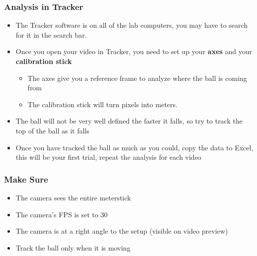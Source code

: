 \documentclass[aspectratio=169]{beamer}
\begin{document}
\begin{frame}
  \frametitle{Analysis in Tracker}
  \begin{itemize}
  \item The Tracker software is on all of the lab computers, you may have to search for it in the search bar. 
  \item Once you open your video in Tracker, you need to set up your \textbf{axes} and your \textbf{calibration stick}
    \begin{itemize}
    \item The axes give you a reference frame to analyze where the ball is coming from
    \item The calibration stick will turn pixels into meters.
    \end{itemize}
  \item The ball will not be very well defined the faster it falls, so try to track the top of the ball as it falls
  \item Once you have tracked the ball as much as you could, copy the data to Excel, this will be your first trial, repeat the analysis for each video
  \end{itemize}
\end{frame}

\begin{frame}
  \frametitle{Make Sure}
  \begin{itemize}
  \item The camera sees the entire meterstick
  \item The camera's FPS is set to 30
  \item The camera is at a right angle to the setup (visible on video preview)
  \item Track the ball only when it is moving
  \end{itemize}
\end{frame}
\end{document}
